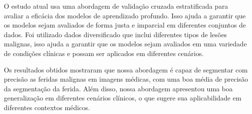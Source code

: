 O estudo atual usa uma abordagem de validação cruzada estratificada para avaliar a eficácia dos modelos de aprendizado profundo. Isso ajuda a garantir que os modelos sejam avaliados de forma justa e imparcial em diferentes conjuntos de dados. Foi utilizado dados diversificado que inclui diferentes tipos de lesões malignas, isso ajuda a garantir que os modelos sejam avaliados em uma variedade de condições clínicas e possam ser aplicados em diferentes cenários.

Os resultados obtidos mostraram que nossa abordagem é capaz de segmentar com precisão as feridas malignas em imagens médicas, com uma boa média de precisão da segmentação da ferida. Além disso, nossa abordagem apresentou uma boa generalização em diferentes cenários clínicos, o que sugere sua aplicabilidade em diferentes contextos médicos.
